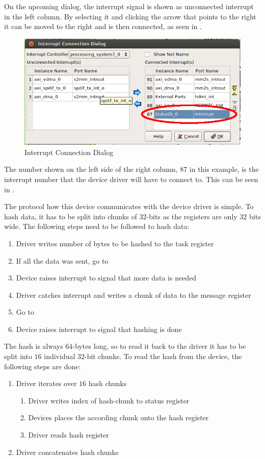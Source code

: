 On the upcoming dialog, the interrupt signal is shown as unconnected interrupt
in the left column.
By selecting it and clicking the arrow that points to the right it can be moved
to the right and is then connected, as seen in .

\begin{figure}[h]
\centering
\includegraphics[width=1\textwidth]{sections/methodology/gicconnect}
\caption{\label{fig:gicconnect} Interrupt Connection Dialog}
\end{figure}

The number shown on the left side of the right column, $87$ in this example, is
the interrupt number that the device driver will have to connect to.
This can be seen in .

The protocol how this device communicates with the device driver is simple.
To hash data, it has to be split into chunks of $32$-bits as the registers are
only $32$ bits wide.
The following steps need to be followed to hash data:
\begin{enumerate}
	\item Driver writes number of bytes to be hashed to the task register
	\item If all the data was sent, go to \label{item:check}
	\item Device raises interrupt to signal that more data is needed
	\item Driver catches interrupt and writes a chunk of data to the message
		register
	\item Go to 
	\item Device raises interrupt to signal that hashing is done\label{item:end}
\end{enumerate}
The hash is always $64$-bytes long, so to read it back to the driver it has to
be split into $16$ individual $32$-bit chunks.
To read the hash from the device, the following steps are done:
\begin{enumerate}
	\item Driver iterates over $16$ hash chunks
		\begin{enumerate}
			\item Driver writes index of hash-chunk to status register
			\item Devices places the according chunk onto the hash register
			\item Driver reads hash register
		\end{enumerate}
	\item Driver concatenates hash chunks
\end{enumerate}

